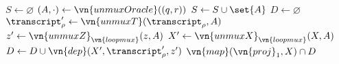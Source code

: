 \begin{algorithmic}
    \State \Let $S \gets \varnothing$
      \State \Let $(A, \cdot) \gets \vn{unmuxOracle}((q, r))$
      \State \Let $S \gets S \cup \set{A}$
    \EndFor
    \State \Let $D \gets \varnothing$
      \State \Let $\transcript_\rho' \gets \vn{unmuxT}(\transcript_\rho, A)$
      \State \Let $z' \gets \vn{unmuxZ}_{\vn{loopmux}}(z, A)$
      \State \Let $X' \gets \vn{unmuxX}_{\vn{loopmux}}(X, A)$
      \State \Let $D \gets D \cup \vn{dep}(X', \transcript_\rho', z')$
    \EndFor
    \State \Return $\vn{map}(\vn{proj}_1, X) \cap D$
  \EndFunction
\end{algorithmic}
